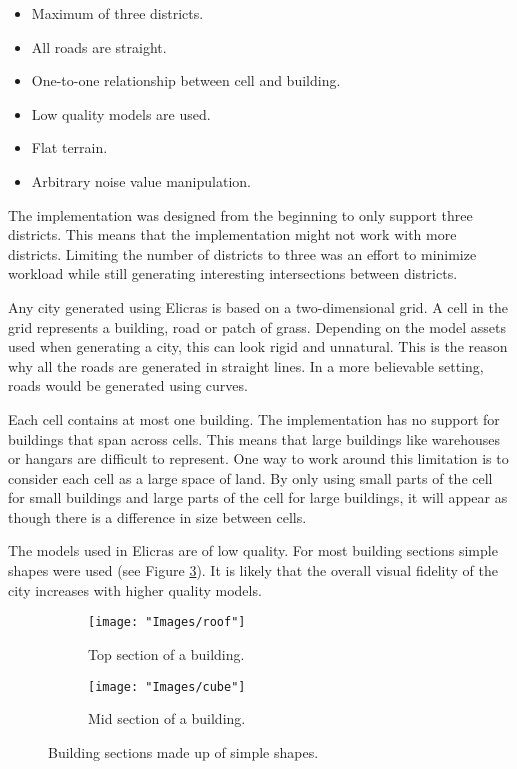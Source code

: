 \begin{itemize}
	\setlength\itemsep{0.01cm}
	\item Maximum of three districts.
	\item All roads are straight.
	\item One-to-one relationship between cell and building.
	\item Low quality models are used.
	\item Flat terrain.
	\item Arbitrary noise value manipulation.
\end{itemize}
	
The implementation was designed from the beginning to only support three districts. This means that the implementation might not work with more districts. Limiting the number of districts to three was an effort to minimize workload while still generating interesting intersections between districts.
\par
Any city generated using Elicras is based on a two-dimensional grid. A cell in the grid represents a building, road or patch of grass. Depending on the model assets used when generating a city, this can look rigid and unnatural. This is the reason why all the roads are generated in straight lines. In a more believable setting, roads would be generated using curves\cite{CurvedRoads}.
\par
Each cell contains at most one building. The implementation has no support for buildings that span across cells. This means that large buildings like warehouses or hangars are difficult to represent. One way to work around this limitation is to consider each cell as a large space of land. By only using small parts of the cell for small buildings and large parts of the cell for large buildings, it will appear as though there is a difference in size between cells.
\par
The models used in Elicras are of low quality. For most building sections simple shapes were used (see Figure \ref{fig:simple-sections}). It is likely that the overall visual fidelity of the city increases with higher quality models.

\begin{figure}[h]
	\centering
	\begin{subfigure}{0.35\textwidth}
		\centering
		\texttt{[image: "Images/roof"]}
		\caption{Top section of a building.}
		\label{fig:roof-mesh}
	\end{subfigure}
	\begin{subfigure}{0.35\textwidth}
		\centering
		\texttt{[image: "Images/cube"]}
		\caption{Mid section of a building.}
		\label{fig:cube-mesh}
	\end{subfigure}
	\caption{Building sections made up of simple shapes.}
	\label{fig:simple-sections}
\end{figure}

